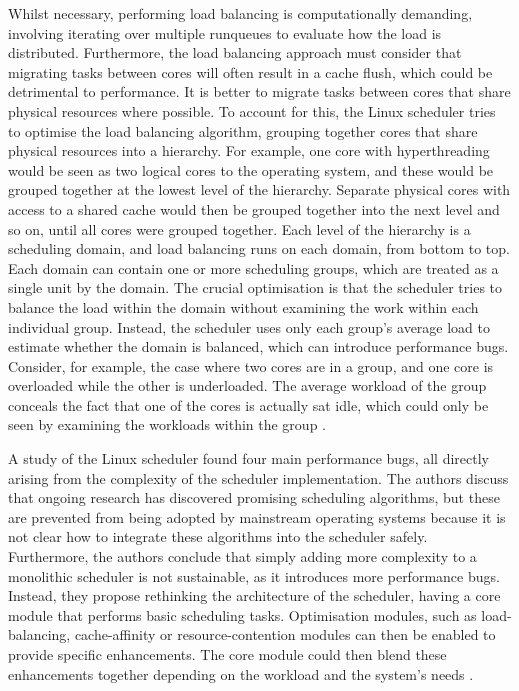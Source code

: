 \documentclass[bsc,frontabs,twoside,singlespacing,parskip,deptreport]{infthesis}     %
\begin{document}
Whilst necessary, performing load balancing is computationally demanding, involving iterating over multiple runqueues to evaluate how the load is distributed. Furthermore, the load balancing approach must consider that migrating tasks between cores will often result in a cache flush, which could be detrimental to performance. It is better to migrate tasks between cores that share physical resources where possible. To account for this, the Linux scheduler tries to optimise the load balancing algorithm, grouping together cores that share physical resources into a hierarchy. For example, one core with hyperthreading would be seen as two logical cores to the operating system, and these would be grouped together at the lowest level of the hierarchy. Separate physical cores with access to a shared cache would then be grouped together into the next level and so on, until all cores were grouped together. Each level of the hierarchy is a scheduling domain, and load balancing runs on each domain, from bottom to top. Each domain can contain one or more scheduling groups, which are treated as a single unit by the domain. The crucial optimisation is that the scheduler tries to balance the load within the domain without examining the work within each individual group. Instead, the scheduler uses only each group's average load to estimate whether the domain is balanced, which can introduce performance bugs. Consider, for example, the case where two cores are in a group, and one core is overloaded while the other is underloaded. The average workload of the group conceals the fact that one of the cores is actually sat idle, which could only be seen by examining the workloads within the group \cite{wasted-cores}.

A study of the Linux scheduler found four main performance bugs, all directly arising from the complexity of the scheduler implementation. The authors discuss that ongoing research has discovered promising scheduling algorithms, but these are prevented from being adopted by mainstream operating systems because it is not clear how to integrate these algorithms into the scheduler safely. Furthermore, the authors conclude that simply adding more complexity to a monolithic scheduler is not sustainable, as it introduces more performance bugs. Instead, they propose rethinking the architecture of the scheduler, having a core module that performs basic scheduling tasks. Optimisation modules, such as load-balancing, cache-affinity or resource-contention modules can then be enabled to provide specific enhancements. The core module could then blend these enhancements together depending on the workload and the system's needs \cite{wasted-cores}.
\end{document}
